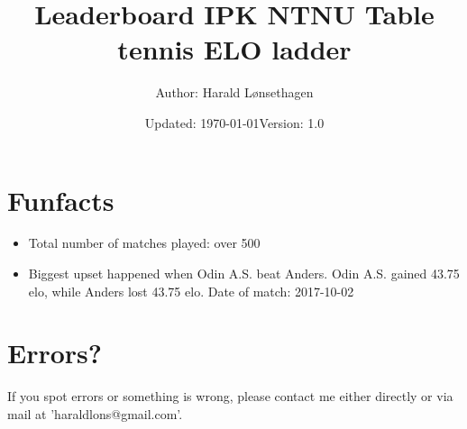 \documentclass[11pt]{article}
\newcommand\tab[1][1cm]{\hspace*{#1}}
\begin{document}
\title{\textbf{Leaderboard IPK NTNU Table tennis ELO ladder }}
\author{Author: Harald Lønsethagen}
\date{Updated: \today\tab Version: 1.0}

\maketitle
 

\makeatletter


\section*{Funfacts}
\begin{itemize}
    \item Total number of matches played: over 500
    \item Biggest upset happened when Odin A.S. beat Anders. Odin A.S. gained 43.75 elo, while Anders lost 43.75 elo. Date of match: 2017-10-02
\end{itemize}
\section*{Errors?}
If you spot errors or something is wrong, please contact me either directly or via mail at 'haraldlons@gmail.com'.
\end{document}
